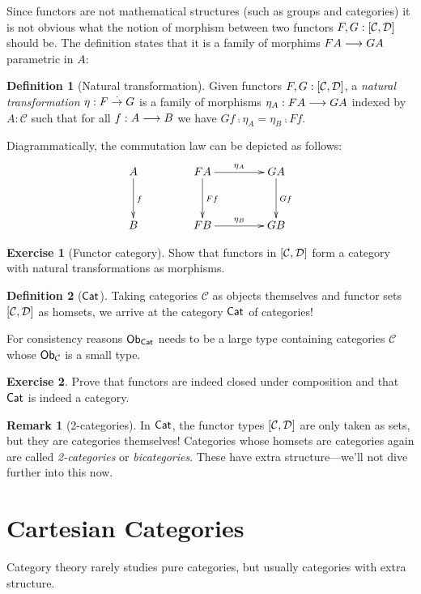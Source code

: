 \documentclass[a4paper,fleqn]{scrartcl}
\theoremstyle{definition}
\newtheorem{definition}{Definition}
\newtheorem{remark}{Remark}
\newtheorem{exercise}{Exercise}
\newcommand{\C}{\mathcal{C}}
\begin{document}
Since functors are not mathematical structures (such as groups and
categories) it is not obvious what the notion of morphism between two
functors $F,G : [\C,\D]$ should be.  The definition states that it is
a family of morphims $F A \too G A$ parametric in $A$:
\begin{definition}[Natural transformation]
  Given functors $F,G : [\C,\D]$, a \emph{natural transformation}
  $\eta : F \todot G$ is a family of morphisms $\eta_A : F A \too G A$
  indexed by $A : \C$ such that for all $f : A \too B$ we have $Gf
  \comp \eta_A = \eta_B \comp Ff$.
\end{definition}
Diagrammatically, the commutation law can be depicted as follows:
\[
\xymatrix@R=8ex@C=10ex{
A \ar[d]^f & F A \ar[d]^{F f} \ar[r]^{\eta_A} & G A \ar[d]^{G f} \\
B & F B \ar[r]^{\eta_B} & G B \\
}
\]
\begin{exercise}[Functor category]
  Show that functors in $[\C,\D]$ form a category with natural
  transformations as morphisms.
\end{exercise}
\begin{definition}[$\Cat$]
  Taking categories $\C$ as objects themselves and functor sets
  $[\C,\D]$ as homsets, we arrive at the category $\Cat$ of
  categories!

  For consistency reasons $\Ob[\Cat]$ needs to be a large type
  containing categories $\C$ whose $\Ob[\C]$ is a small type.
\end{definition}
\begin{exercise}
  Prove that functors are indeed closed under composition and that
  $\Cat$ is indeed a category.
\end{exercise}
\begin{remark}[2-categories]
  In $\Cat$, the functor types $[\C,\D]$ are only taken as sets, but
  they are categories themselves!  Categories whose homsets are
  categories again are called \emph{2-categories} or
  \emph{bicategories}.  These have extra structure---we'll not dive
  further into this now.
\end{remark}


\section{Cartesian Categories}

Category theory rarely studies pure categories, but usually categories with
extra structure.
\end{document}
